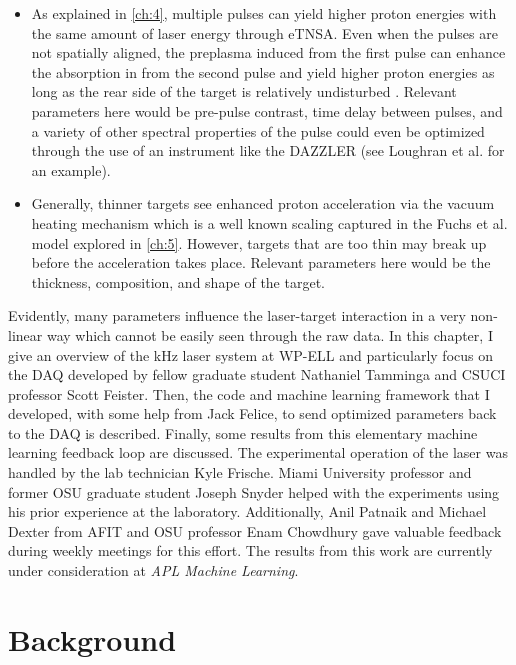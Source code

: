 \begin{itemize}
\item As explained in \autoref{ch:4}, multiple pulses can yield higher proton energies with the same amount of laser energy through \gls{eTNSA}. Even when the pulses are not spatially aligned, the preplasma induced from the first pulse can enhance the absorption in from the second pulse and yield higher proton energies as long as the rear side of the target is relatively undisturbed \cite{Macchi_2013_RevModPhys}. Relevant parameters here would be pre-pulse contrast, time delay between pulses, and a variety of other spectral properties of the pulse could even be optimized through the use of an instrument like the DAZZLER (see Loughran et al. \cite{Loughran_2023_HPLSE} for an example). 

\item Generally, thinner targets see enhanced proton acceleration via the vacuum heating mechanism which is a well known scaling captured in the Fuchs et al. \cite{Fuchs_2005_Nat} model explored in \autoref{ch:5}. However, targets that are too thin may break up before the acceleration takes place. Relevant parameters here would be the thickness, composition, and shape of the target. 
\end{itemize}
Evidently, many parameters influence the laser-target interaction in a very non-linear way which cannot be easily seen through the raw data. In this chapter, I give an overview of the kHz laser system at \gls{WP-ELL} and particularly focus on the \gls{DAQ} developed by fellow graduate student Nathaniel Tamminga and \gls{CSUCI} professor Scott Feister. Then, the code and machine learning framework that I developed, with some help from Jack Felice, to send optimized parameters back to the \gls{DAQ} is described. Finally, some results from this elementary machine learning feedback loop are discussed. The experimental operation of the laser was handled by the lab technician Kyle Frische. Miami University professor and former OSU graduate student Joseph Snyder helped with the experiments using his prior experience at the laboratory. Additionally, Anil Patnaik and Michael Dexter from AFIT and OSU professor Enam Chowdhury gave valuable feedback during weekly meetings for this effort. The results from this work are currently under consideration at \emph{APL Machine Learning}.

\section{Background}

